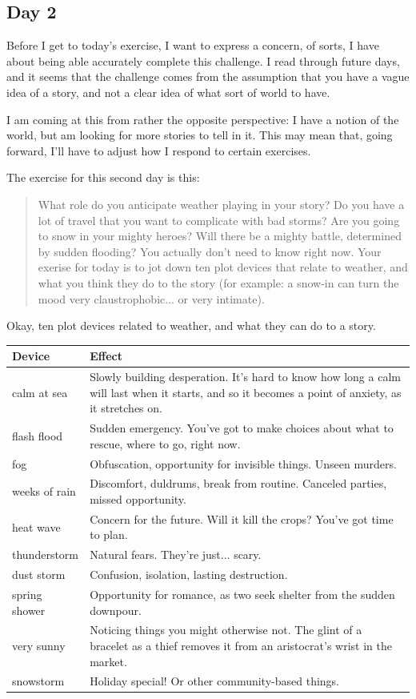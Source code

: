 \documentclass[11pt]{article}
\begin{document}
\subsection*{Day 2}
\label{sec:orgf7d8828}
Before I get to today's exercise, I want to express a concern, of
sorts, I have about being able accurately complete this challenge. I
read through future days, and it seems that the challenge comes from
the assumption that you have a vague idea of a story, and not a clear
idea of what sort of world to have.

I am coming at this from rather the opposite perspective: I have a
notion of the world, but am looking for more stories to tell in it.
This may mean that, going forward, I'll have to adjust how I respond
to certain exercises.

The exercise for this second day is this:

\begin{quote}
What role do you anticipate weather playing in your story? Do you have
a lot of travel that you want to complicate with bad storms? Are you
going to snow in your mighty heroes? Will there be a mighty battle,
determined by sudden flooding? You actually don't need to know right
now. Your exerise for today is to jot down ten plot devices that
relate to weather, and what you think they do to the story (for
example: a snow-in can turn the mood very claustrophobic... or very
intimate).
\end{quote}

Okay, ten plot devices related to weather, and what they can do to a
story.

\begin{center}
\begin{tabular}{ll}
Device & Effect\\
\hline
calm at sea & Slowly building desperation. It's hard to know how long a calm will last when it starts, and so it becomes a point of anxiety, as it stretches on.\\
flash flood & Sudden emergency. You've got to make choices about what to rescue, where to go, right now.\\
fog & Obfuscation, opportunity for invisible things. Unseen murders.\\
weeks of rain & Discomfort, duldrums, break from routine. Canceled parties, missed opportunity.\\
heat wave & Concern for the future. Will it kill the crops? You've got time to plan.\\
thunderstorm & Natural fears. They're just... scary.\\
dust storm & Confusion, isolation, lasting destruction.\\
spring shower & Opportunity for romance, as two seek shelter from the sudden downpour.\\
very sunny & Noticing things you might otherwise not. The glint of a bracelet as a thief removes it from an aristocrat's wrist in the market.\\
snowstorm & Holiday special! Or other community-based things.\\
\end{tabular}
\end{center}
\end{document}
